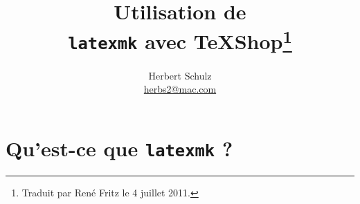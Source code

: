 \documentclass[11pt,french]{article}
\newcommand{\TS}{\textsf{\TeX Shop}}
\begin{document}
\title{Utilisation de\\ \texttt{latexmk} avec \TS\thanks{Traduit par René Fritz le 4 juillet 2011.}}
\author{Herbert Schulz\\\small\href{mailto:herbs2@mac.com}{herbs2@mac.com}}
\date{}


\maketitle
\thispagestyle{empty}

\section{Qu'est-ce que \texttt{latexmk} ?}

\end{document}
